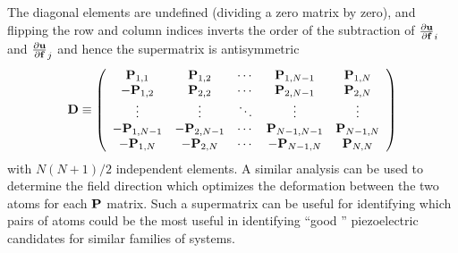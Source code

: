The diagonal elements are undefined (dividing a zero matrix by zero), and flipping the
row and column indices inverts the order of the subtraction of ${\frac{\partial {\ensuremath{\bf{u}}}}{\partial {\ensuremath{\bf{f}}}}}_i$ and ${\frac{\partial {\ensuremath{\bf{u}}}}{\partial {\ensuremath{\bf{f}}}}}_j $ and hence the 
supermatrix is antisymmetric
\begin{equation} 
  {\mathbf D} \equiv 
            \left(
              \begin{array}{ccccc}
                  {\mathbf P}_{1,1}   &   {\mathbf P}_{1,2}   & \cdots &   {\mathbf P}_{1,N-1}   &   {\mathbf P}_{1,N}   \\
                 -{\mathbf P}_{1,2}   &   {\mathbf P}_{2,2}   & \cdots &   {\mathbf P}_{2,N-1}   &   {\mathbf P}_{2,N}   \\
                  \vdots          &   \vdots          & \ddots &   \vdots            &   \vdots          \\
                 -{\mathbf P}_{1,N-1} &  -{\mathbf P}_{2,N-1} & \cdots &   {\mathbf P}_{N-1,N-1} &   {\mathbf P}_{N-1,N} \\
                 -{\mathbf P}_{1,N}   &  -{\mathbf P}_{2,N}   & \cdots &  -{\mathbf P}_{N-1,N}   &   {\mathbf P}_{N,N}   \\
              \end{array}
            \right)
\end{equation}
with $N(N+1)/2$ independent elements.
A similar analysis can be used to determine the field direction which optimizes the deformation between the two atoms for each ${\bf{P}}$ matrix.
Such a supermatrix can be useful for identifying which pairs of atoms could be the most useful in identifying ``good '' piezoelectric candidates
for similar families of systems.  
% 
